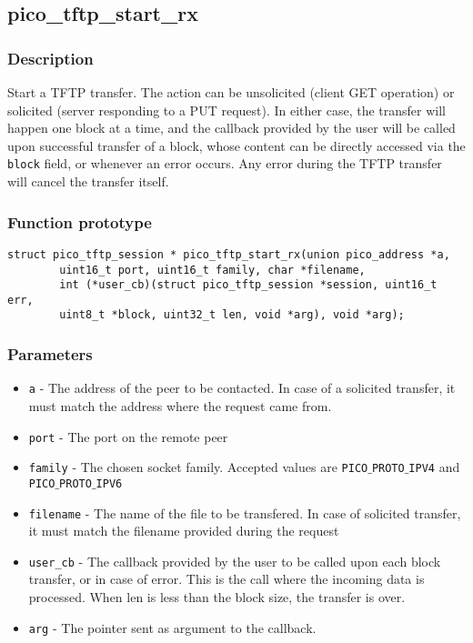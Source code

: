 \subsection{pico\_tftp\_start\_rx}

\subsubsection*{Description}
Start a TFTP transfer. The action can be unsolicited (client GET operation) or solicited (server responding to a PUT request).
In either case, the transfer will happen one block at a time, and the callback provided by the user will be called upon successful
transfer of a block, whose content can be directly accessed via the \texttt{block} field,  or whenever an error occurs. Any error during the TFTP transfer will cancel the transfer itself.

\subsubsection*{Function prototype}
\begin{verbatim}
struct pico_tftp_session * pico_tftp_start_rx(union pico_address *a,
        uint16_t port, uint16_t family, char *filename,
        int (*user_cb)(struct pico_tftp_session *session, uint16_t err,
        uint8_t *block, uint32_t len, void *arg), void *arg);
\end{verbatim}

\subsubsection*{Parameters}
\begin{itemize}[noitemsep]
\item \texttt{a} - The address of the peer to be contacted. In case of a solicited transfer, it must match the address where the request came from.
\item \texttt{port} - The port on the remote peer
\item \texttt{family} - The chosen socket family. Accepted values are \texttt{PICO$\_$PROTO$\_$IPV4} and \texttt{PICO$\_$PROTO$\_$IPV6}
\item \texttt{filename} - The name of the file to be transfered. In case of solicited transfer, it must match the filename provided during the request
\item \texttt{user\_cb} - The callback provided by the user to be called upon each block transfer, or in case of error. This is the call where the incoming data is processed. When len is less than the block size, the transfer is over.
\item \texttt{arg} - The pointer sent as argument to the callback.
\end{itemize}

